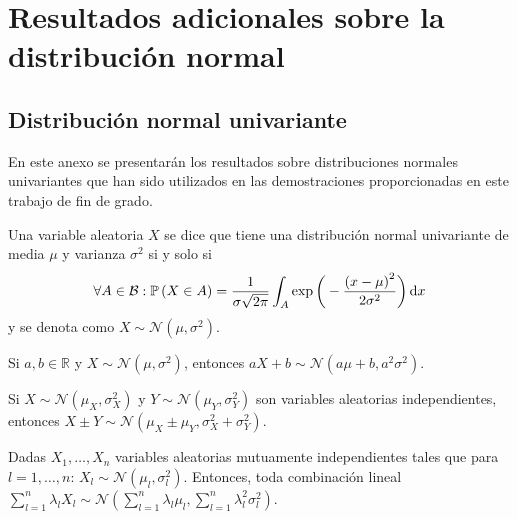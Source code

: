 \appendix

\chapter{Resultados adicionales sobre la distribución normal}

\section{Distribución normal univariante}

En este anexo se presentarán los resultados sobre distribuciones
normales univariantes que han sido utilizados en las demostraciones
proporcionadas en este trabajo de fin de grado.

\begin{definition}
	Una variable aleatoria $X$ se dice que tiene una distribución
	normal univariante de media $\mu$ y varianza $\sigma^{2}$ si y solo
	si
	\begin{equation*}
		\forall A\in\mathcal{B}:
		\mathbb{P}
		\left(X\in A\right)=
		\frac{1}{\sigma\sqrt{2\pi}}
		\int_{A}
		\exp
		\bigg(
		-\frac{\left(x-\mu\right)^2}{2\sigma^{2}}
		\bigg)
		\dl x
	\end{equation*}
	y se denota como $X\sim\mathcal{N}\left(\mu,\sigma^{2}\right)$.
\end{definition}

\begin{proposition}
	Si $a,b\in\mathbb{R}$ y
	$X\sim\mathcal{N}\left(\mu,\sigma^{2}\right)$, entonces
	$aX+b\sim\mathcal{N}\left(a\mu+b,a^{2}\sigma^2\right)$.
\end{proposition}

\begin{proposition}
	Si $X\sim\mathcal{N}\left(\mu_{X},\sigma_{X}^2\right)$ y
	$Y\sim\mathcal{N}\left(\mu_{Y},\sigma_{Y}^{2}\right)$ son variables
	aleatorias independientes, entonces
	\begin{math}
		X\pm Y\sim
		\mathcal{N}\left(\mu_{X}\pm\mu_{Y},\sigma_{X}^{2}+\sigma_{Y}^{2}\right)
	\end{math}.
\end{proposition}

\begin{proposition}\label{prop:linearcombination}
	Dadas $X_{1},\dotsc,X_{n}$ variables aleatorias mutuamente
	independientes tales que para $l=1,\dotsc,n$:
	$X_{l}\sim\mathcal{N}\left(\mu_{l},\sigma_{l}^{2}\right)$.
	Entonces, toda combinación lineal
	\begin{math}
		\sum_{l=1}^{n}
		\lambda_{l}
		X_{l}\sim
		\mathcal{N}
		\left(
		\sum_{l=1}^{n}\lambda_{l}\mu_{l},
		\sum_{l=1}^{n}\lambda_{l}^{2}\sigma_{l}^{2}
		\right)
	\end{math}.
\end{proposition}

